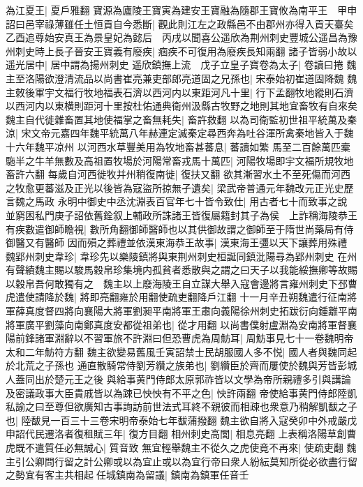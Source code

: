 為江夏王|{
	夏戶雅翻}
寶源為廬陵王寶寅為建安王寶融為隨郡王寶攸為南平王　甲申詔曰邑宰祿薄雖任土恒貢自今悉斷|{
	觀此則江左之政縣邑不由郡州亦得入貢天臺矣}
乙酉追尊始安真王為景皇妃為懿后　丙戌以聞喜公遥欣為荆州刺史豐城公遥昌為豫州刺史時上長子晉安王寶義有廢疾|{
	痼疾不可復用為廢疾長知兩翻}
諸子皆弱小故以遥光居中|{
	居中謂為揚州刺史}
遥欣鎮撫上流　戊子立皇子寶卷為太子|{
	卷讀曰捲}
魏主至洛陽欲澄清流品以尚書崔亮兼吏部郎亮道固之兄孫也|{
	宋泰始初崔道固降魏}
魏主敇後軍宇文福行牧地福表石濟以西河内以東距河凡十里|{
	行下孟翻牧地縱則石濟以西河内以東横則距河十里按杜佑通典衛州汲縣古牧野之地則其地宜畜牧有自來矣}
魏主自代徙雜畜置其地使福掌之畜無耗失|{
	畜許救翻}
以為司衛監初世祖平統萬及秦涼|{
	宋文帝元嘉四年魏平統萬八年赫連定滅秦定尋西奔為吐谷渾所禽秦地皆入于魏十六年魏平凉州}
以河西水草豐美用為牧地畜甚蕃息|{
	蕃讀如繁}
馬至二百餘萬匹槖駞半之牛羊無數及高祖置牧場於河陽常畜戎馬十萬匹|{
	河陽牧場即宇文福所規牧地畜許六翻}
每歲自河西徙牧并州稍復南徙|{
	復扶又翻}
欲其漸習水土不至死傷而河西之牧愈更蕃滋及正光以後皆為寇盜所掠無孑遺矣|{
	梁武帝普通元年魏改元正光史歷言魏之馬政}
永明中御史中丞沈淵表百官年七十皆令致仕|{
	用古者七十而致事之說}
並窮困私門庚子詔依舊銓叙上輔政所誅諸王皆復屬籍封其子為侯　上詐稱海陵恭王有疾數遣御師瞻視|{
	數所角翻御師醫師也以其供御故謂之御師至于隋世尚藥局有侍御醫又有醫師}
因而殞之葬禮並依漢東海恭王故事|{
	漢東海王彊以天下讓葬用殊禮}
魏郢州刺史韋珍|{
	韋珍先以樂陵鎮將與東荆州刺史桓誕同鎮沘陽尋為郢州刺史}
在州有聲績魏主賜以駿馬穀帛珍集境内孤貧者悉散與之謂之曰天子以我能綏撫卿等故賜以穀帛吾何敢獨有之　魏主以上廢海陵王自立謀大舉入寇會邊將言雍州刺史下邳曹虎遣使請降於魏|{
	將即亮翻雍於用翻使疏吏翻降戶江翻}
十一月辛丑朔魏遣行征南將軍薛真度督四將向襄陽大將軍劉昶平南將軍王肅向義陽徐州刺史拓跋衍向鍾離平南將軍廣平劉藻向南鄭真度安都從祖弟也|{
	從才用翻}
以尚書僕射盧淵為安南將軍督襄陽前鋒諸軍淵辭以不習軍旅不許淵曰但恐曹虎為周魴耳|{
	周魴事見七十一卷魏明帝太和二年魴符方翻}
魏主欲變易舊風壬寅詔禁士民胡服國人多不悦|{
	國人者與魏同起於北荒之子孫也}
通直散騎常侍劉芳纘之族弟也|{
	劉纘臣於齊而屢使於魏與芳皆彭城人蓋同出於楚元王之後}
與給事黄門侍郎太原郭祚皆以文學為帝所親禮多引與講論及密議政事大臣貴戚皆以為踈已怏怏有不平之色|{
	怏許兩翻}
帝使給事黄門侍郎陸凱私諭之曰至尊但欲廣知古事詢訪前世法式耳終不親彼而相疎也衆意乃稍解凱馛之子也|{
	陸馛見一百三十三卷宋明帝泰始七年馛蒲撥翻}
魏主欲自將入寇癸卯中外戒嚴戊申詔代民遷洛者復租賦三年|{
	復方目翻}
相州刺史高閭|{
	相息亮翻}
上表稱洛陽草創曹虎既不遣質任必無誠心|{
	質音致}
無宜輕舉魏主不從久之虎使竟不再來|{
	使疏吏翻}
魏主引公卿問行留之計公卿或以為宜止或以為宜行帝曰衆人紛紜莫知所從必欲盡行留之勢宜有客主共相起任城鎮南為留議|{
	鎮南為鎮軍任音壬}
